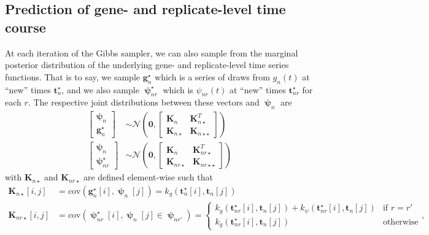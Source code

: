 \documentclass[11pt]{article}
\newcommand{\pN}{\mathcal{N}}
\newcommand{\1}{\mathbf{1}}
\newcommand{\0}{\mathbf{0}}
\newcommand{\K}{\mathbf{K}}
\begin{document}
\subsection{Prediction of gene- and replicate-level time course}
%
%
%
At each iteration of the Gibbs sampler, we can also sample from the marginal posterior distribution of the underlying gene- and replicate-level time series functions. That is to say, we sample $\mathbf{g}_n^\star$ which is a series of draws from $g_n(t)$ at ``new'' times $\mathbf{t}_{n}^\star$, and we also sample $\bm{\uppsi}_{nr}^{\star}$ which is $\psi_{nr}(t)$ at ``new'' times $\mathbf{t}_{nr}^\star$ for each $r$. The respective joint distributions between these vectors and $\bm{\uppsi}_{n}$ are 
%
%
\begin{align*}
	\begin{bmatrix}
			\bm{\uppsi}_{n} \\
			\mathbf{g}_{n}^\star 
	\end{bmatrix} &\sim \pN \left( \mathbf{0}, \begin{bmatrix}
 			\K_n & \K_{n\star}^T \\
 			\K_{n\star} & \K_{n\star\star}
 		\end{bmatrix} \right) \\
%
%
	\begin{bmatrix}
		\bm{\uppsi}_{n} \\
		\bm{\uppsi}_{nr}^\star
	\end{bmatrix} &\sim \pN \left( \mathbf{0}, \begin{bmatrix}
		\K_n & \K_{nr\star}^T \\
		\K_{nr\star} & \K_{nr\star\star}
	\end{bmatrix} \right) 
\end{align*}
%
%
with $\K_{n\star}$ and $\K_{nr\star}$ are defined element-wise such that 
%
%
\begin{align*}
	\K_{n\star}[i, j] &= \text{cov}\left( \mathbf{g}_{n}^\star[i] , \bm{\uppsi}_{n}[j] \right) = k_g(\mathbf{t}_{n}^\star[i], \mathbf{t}_n[j]) \\
	\K_{nr\star}[i, j] &= \text{cov}\left( \bm{\uppsi}_{nr}^\star[i], \bm{\uppsi}_{n}[j] \in \bm{\uppsi}_{nr'}  \right) = \begin{cases}
		k_g(\mathbf{t}_{nr}^\star[i], \mathbf{t}_n[j]) + k_\psi(\mathbf{t}_{nr}^\star[i], \mathbf{t}_n[j]) & \text{if } r = r' \\
		k_g(\mathbf{t}_{nr}^\star[i], \mathbf{t}_n[j]) & \text{otherwise}
	\end{cases},
\end{align*}
\end{document}
